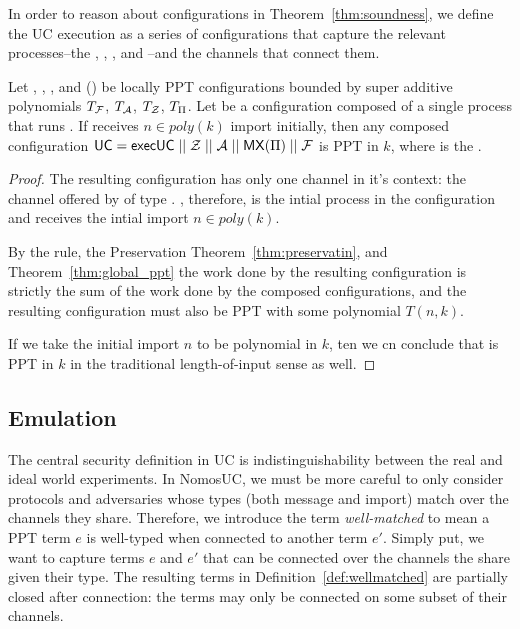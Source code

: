 In order to reason about configurations in Theorem~\ref{thm:soundness}, we define the UC execution as a series of configurations that capture the relevant processes--the \partywrapper, \Z, \F, and \A--and the channels that connect them.

\begin{theorem} \label{thm:soundness}
Let \F, \A, \Z, and (\PI) be locally PPT configurations bounded by super additive polynomials $T_\mathcal{F}$, $T_\mathcal{A}$, $T_\mathcal{Z}$, $T_\Pi$. Let  be a configuration composed of a single process that runs . If  receives $n \in poly(k)$ import initially, then any composed configuration $\mathsf{UC} = \mathsf{execUC} \; || \; \mathcal{Z} \; || \; \mathcal{A} \; || \; \mathsf{MX}(\Pi) \; || \; \mathcal{F}$ is PPT in $k$, where  is the \partywrapper.
\end{theorem}

\begin{proof}
The resulting configuration  has only one channel in it's context: the channel offered by  of type . 
, therefore, is the intial process in the configuration and receives the intial import $n \in poly(k)$.

By the  rule, the Preservation Theorem~\ref{thm:preservatin}, and Theorem~\ref{thm:global_ppt} the work done by the resulting configuration is strictly the sum of the work done by the composed configurations, and the resulting configuration  must also be PPT with some polynomial $T(n,k)$.

If we take the initial import $n$ to be polynomial in $k$, ten we cn conclude that  is PPT in $k$ in the traditional length-of-input sense as well.

\end{proof}


\subsection{Emulation}
The central security definition in UC is indistinguishability between the real and ideal world experiments.
In NomosUC, we must be more careful to only consider protocols and adversaries whose types (both message and import) match over the channels they share. 
Therefore, we introduce the term \textit{well-matched} to mean a PPT term $e$ is well-typed when connected to another term $e'$.
Simply put, we want to capture terms $e$ and $e'$ that can be connected over the channels the share given their type.
The resulting terms in Definition~\ref{def:wellmatched} are partially closed after connection: the terms may only be connected on some subset of their channels.

